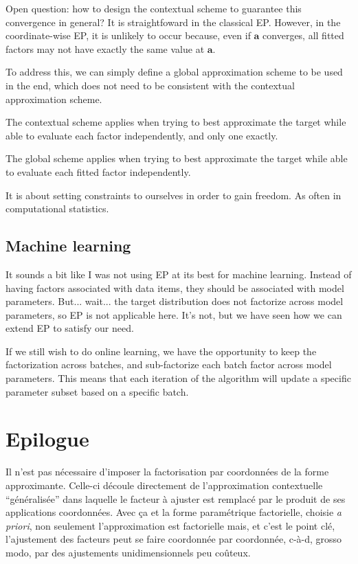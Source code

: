 \documentclass{article}
\def\a{{\mathbf{a}}}
\begin{document}
Open question: how to design the contextual scheme to guarantee this convergence in general? It is straightfoward in the classical EP. However, in the coordinate-wise EP, it is unlikely to occur because, even if $\a$ converges, all fitted factors may not have exactly the same value at $\a$. 

To address this, we can simply define a global approximation scheme to be used in the end, which does not need to be consistent with the contextual approximation scheme. 

The contextual scheme applies when trying to best approximate the target while able to evaluate each factor independently, and only one exactly. 

The global scheme applies when trying to best approximate the target while able to evaluate each fitted factor independently. 

It is about setting constraints to ourselves in order to gain freedom. As often in computational statistics.


\subsection{Machine learning}

It sounds a bit like I was not using EP at its best for machine learning. Instead of having factors associated with data items, they should be associated with model parameters. But... wait... the target distribution does not factorize across model parameters, so EP is not applicable here. It's not, but we have seen how we can extend EP to satisfy our need.

If we still wish to do online learning, we have the opportunity to keep the factorization across batches, and sub-factorize each batch factor across model parameters. This means that each iteration of the algorithm will update a specific parameter subset based on a specific batch.


\section{Epilogue}

Il n'est pas n\'ecessaire d'imposer la factorisation par coordonn\'ees de la forme approximante. Celle-ci d\'ecoule directement de l'approximation contextuelle ``g\'en\'eralis\'ee'' dans laquelle le facteur \`a ajuster est remplac\'e par le produit de ses applications coordonn\'ees. Avec \c ca et la forme param\'etrique factorielle, choisie {\em a priori}, non seulement l'approximation est factorielle mais, et c'est le point cl\'e, l'ajustement des facteurs peut se faire coordonn\'ee par coordonn\'ee, c-\`a-d, grosso modo, par des ajustements unidimensionnels peu co\^uteux. 
\end{document}
